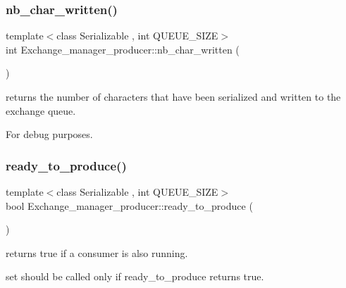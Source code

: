 \subsubsection{\texorpdfstring{nb\+\_\+char\+\_\+written()}{nb\_char\_written()}}
{\footnotesize\ttfamily template$<$class Serializable , int Q\+U\+E\+U\+E\+\_\+\+S\+I\+ZE$>$ \\
int Exchange\+\_\+manager\+\_\+producer\+::nb\+\_\+char\+\_\+written (\begin{DoxyParamCaption}{ }\end{DoxyParamCaption})}



returns the number of characters that have been serialized and written to the exchange queue. 

For debug purposes. \mbox{\label{classshared__memory_1_1Exchange__manager__producer_a3ef5cfdd196a396edfd6ca502119f839}} 
\subsubsection{\texorpdfstring{ready\+\_\+to\+\_\+produce()}{ready\_to\_produce()}}
{\footnotesize\ttfamily template$<$class Serializable , int Q\+U\+E\+U\+E\+\_\+\+S\+I\+ZE$>$ \\
bool Exchange\+\_\+manager\+\_\+producer\+::ready\+\_\+to\+\_\+produce (\begin{DoxyParamCaption}{ }\end{DoxyParamCaption})}



returns true if a consumer is also running. 

\textquotesingle{}set\textquotesingle{} should be called only if ready\+\_\+to\+\_\+produce returns true. \mbox{\label{classshared__memory_1_1Exchange__manager__producer_a0f86798dbbb5bead856c566257bd1b07}} 
